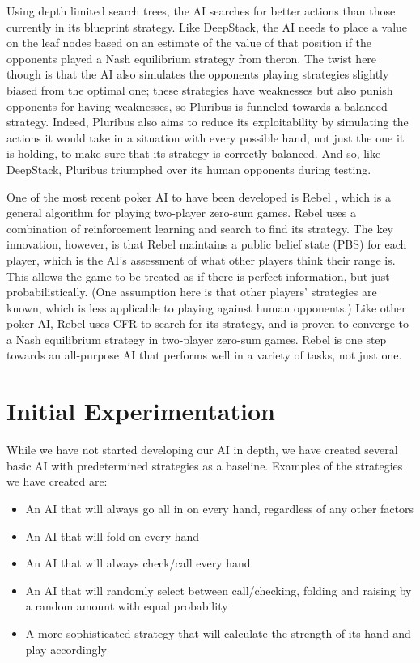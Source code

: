 \documentclass{article}
\begin{document}
\begin{multicols*}{2}
Using depth limited search trees, the AI searches for better actions than those currently in its blueprint strategy. Like DeepStack, the AI needs to place a value on the leaf nodes based on an estimate of the value of that position if the opponents played a Nash equilibrium strategy from theron. The twist here though is that the AI also simulates the opponents playing strategies slightly biased from the optimal one; these strategies have weaknesses but also punish opponents for having weaknesses, so Pluribus is funneled towards a balanced strategy. Indeed, Pluribus also aims to reduce its exploitability by simulating the actions it would take in a situation with every possible hand, not just the one it is holding, to make sure that its strategy is correctly balanced. And so, like DeepStack, Pluribus triumphed over its human opponents during testing.
\newline

One of the most recent poker AI to have been developed is Rebel \cite{Rebel1} \cite{Rebel2}, which is a general algorithm for playing two-player zero-sum games. Rebel uses a combination of reinforcement learning and search to find its strategy. The key innovation, however, is that Rebel maintains a public belief state (PBS) for each player, which is the AI’s assessment of what other players think their range is. This allows the game to be treated as if there is perfect information, but just probabilistically. (One assumption here is that other players’ strategies are known, which is less applicable to playing against human opponents.) Like other poker AI, Rebel uses CFR to search for its strategy, and is proven to converge to a Nash equilibrium strategy in two-player zero-sum games. Rebel is one step towards an all-purpose AI that performs well in a variety of tasks, not just one.




\section{Initial Experimentation}
While we have not started developing our AI in depth, we have created several basic AI with predetermined strategies as a baseline. Examples of the strategies we have created are:

\begin{itemize}
    \item An AI that will always go all in on every hand, regardless of any other factors
    \item An AI that will fold on every hand
    \item An AI that will always check/call every hand
    \item An AI that will randomly select between call/checking, folding and raising by a random amount with equal probability
    \item A more sophisticated strategy that will calculate the strength of its hand and play accordingly
\end{itemize}


\end{multicols*}
\end{document}
